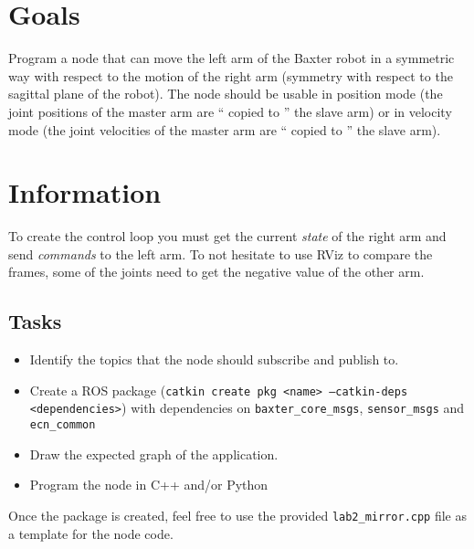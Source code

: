 \documentclass{ecnreport}
\author{O. Kermorgant}
\begin{document}


\section{Goals}

Program a node that can move the left arm of the Baxter robot in a symmetric way with respect to
the motion of the right arm (symmetry with respect to the sagittal plane of the robot).
The node should be usable in position mode (the joint positions of the master arm are `` copied to ''
the slave arm) or in velocity mode (the joint velocities of the master arm are `` copied to '' the slave
arm).

\section{Information}

To create the control loop you must get the current \emph{state} of the right arm and send \emph{commands} to 
the left arm. To not hesitate to use RViz to compare the frames, some of the joints need to get the negative
value of the other arm.

\subsection{Tasks}

\begin{itemize}
\item Identify the topics that the node should subscribe and publish to.
 \item Create a ROS package (\texttt{catkin create pkg <name> --catkin-deps <dependencies>}) with dependencies on \texttt{baxter\_core\_msgs}, 
 \texttt{sensor\_msgs} and \texttt{ecn\_common}
 \item Draw the expected graph of the application. 
 \item Program the node in C++ and/or Python
 \end{itemize}

Once the package is created, feel free to use the provided \texttt{lab2\_mirror.cpp} file as a template for the node code.
 
\end{document}
